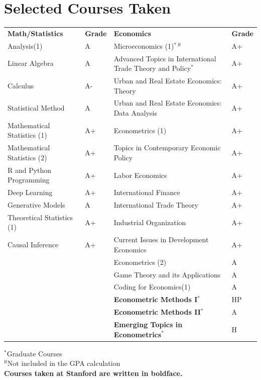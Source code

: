 \documentclass[10pt, letterpaper]{article}
\begin{document}
\section{Selected Courses Taken}
\setlength{\tabcolsep}{3pt}
\begin{tabularx}{\textwidth}{|>{\centering\arraybackslash}X|>{\centering\arraybackslash}p{1cm}|>{\centering\arraybackslash}p{7
			cm}|>{\centering\arraybackslash}p{1cm}|}
	\hline
	\textbf{Math/Statistics} & \textbf{Grade} & \textbf{Economics} & \textbf{Grade} \\
	\hhline{|=|=|=|=|}
	Analysis(1) & A & Microeconomics (1)$^{*\aleph}$ &A+ \\ \hline
	Linear Algebra & A& Advanced Topics in International Trade Theory and Policy$^*$ & A+\\ \hline
	Calculus&A-&Urban and Real Estate Economics: Theory&A+\\ \hline
	Statistical Method&A&Urban and Real Estate Economics: Data Analysis&A+\\ \hline
	Mathematical Statistics (1)&A+&Econometrics (1)& A+\\ \hline
	Mathematical Statistics (2)& A+& Topics in Contemporary Economic Policy & A+\\ \hline
	R and Python Programming&A+&Labor Economics&A+\\ \hline
	Deep Learning&A+& International Finance & A+\\ \hline
	Generative Models	&A&International Trade Theory&A+\\ \hline
	Theoretical Statistics (1)	&A+&Industrial Organization&A+\\ \hline
	Causal Inference&A+&Current Issues in Development Economics&A+\\ \hline
	&&Econometrics (2)&A\\ \hline
	&&Game Theory and its Applications&A\\  \hline
	&&Coding for Economics(1)&A\\ \hline
	&&\textbf{Econometric Methods I}$^*$&HP\\ \hline
	&&\textbf{Econometric Methods II}$^*$&A\\ \hline
	&&\textbf{Emerging Topics in Econometrics}$^*$&H\\ 
	
	
	\hline  

\end{tabularx}
\noindent $^*$Graduate Courses\\
\noindent $^\aleph$Not included in the GPA calculation\\
\noindent \textbf{Courses taken at Stanford are written in boldface.}\\
	
\end{document}
